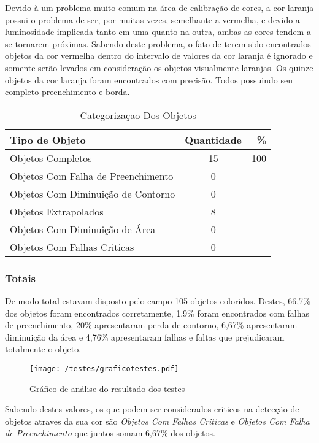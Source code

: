 	Devido à um problema muito comum na área de calibração de cores, a cor laranja possui o problema de ser, por muitas vezes, semelhante a vermelha, e devido a luminosidade implicada tanto em uma quanto na outra, ambas as cores tendem a se tornarem próximas.
	Sabendo deste problema, o fato de terem sido encontrados objetos da cor vermelha dentro do intervalo de valores da cor laranja é ignorado e somente serão levados em consideração os objetos visualmente laranjas.
	Os quinze objetos da cor laranja foram encontrados com precisão. Todos possuindo seu completo preenchimento e borda.
	
\begin{table}[h]
\centering
\begin{tabular}{l|c|r}
Tipo de Objeto & Quantidade  & \% \\ %
\hline                               %
Objetos Completos &  15 & 100 \\
\hline 
Objetos Com Falha de Preenchimento & 0 \\
\hline 
Objetos Com Diminuição de Contorno &  0 \\
\hline 
Objetos Extrapolados & 8 \\
\hline 
Objetos Com Diminuição de Área &  0 \\
\hline 
Objetos Com Falhas Criticas & 0 \\
\hline 
\end{tabular}
\caption{Categorizaçao Dos Objetos}
\end{table}
\newpage
\subsubsection{Totais}
De modo total estavam disposto pelo campo 105 objetos coloridos. Destes, 66,7\% dos objetos foram encontrados corretamente, 1,9\% foram encontrados com falhas de preenchimento, 20\% apresentaram perda de contorno, 6,67\% apresentaram diminuição da área e 4,76\% apresentaram falhas e faltas que prejudicaram totalmente o objeto.
	\begin{figure}[H]
		\centering
		\texttt{[image: /testes/graficotestes.pdf]}
		\caption{Gráfico de análise do resultado dos testes}
		\label{disposicaoparte}
	\end{figure}
	
	
	Sabendo destes valores, os que podem ser considerados criticos na detecção de objetos atraves da sua cor são \textit{Objetos Com Falhas Criticas} e \textit{Objetos Com Falha de Preenchimento} que juntos somam 6,67\% dos objetos.
